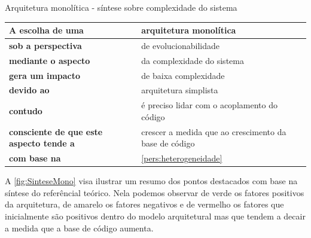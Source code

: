 \begin{quadro}
    \caption{Arquitetura monolítica - síntese sobre complexidade do sistema\label{monolitico:sintese-complexidade}}
    \begin{tabularx}{\linewidth}{ | p{5cm} | X | }
    \hline
    \textbf{A escolha de uma}       & arquitetura monolítica \\ \hline
    \textbf{sob a perspectiva}      & de evolucionabilidade \\ \hline
    \textbf{mediante o aspecto}     & da complexidade do sistema \\ \hline
    \textbf{gera um impacto}        & de baixa complexidade \\ \hline
    \textbf{devido ao}              & arquitetura simplista \\ \hline
    \textbf{contudo}                & é preciso lidar com o acoplamento do código \\ \hline
    \textbf{consciente de que este aspecto tende a} & crescer a medida que ao crescimento da base de código\\ \hline
    \textbf{com base na}            & \autoref{pers:heterogeneidade} \\ \hline
    \end{tabularx}
\end{quadro}

\newpage

A \autoref{fig:SinteseMono} visa ilustrar um resumo dos pontos destacados com base na síntese do
referêncial teórico. Nela podemos observar de verde os fatores positivos da arquitetura, de amarelo
os fatores negativos e de vermelho os fatores que inicialmente são positivos dentro do modelo
arquitetural mas que tendem a decair a medida que a base de código aumenta.

